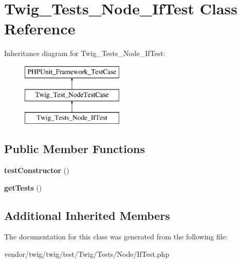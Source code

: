 \hypertarget{classTwig__Tests__Node__IfTest}{}\section{Twig\+\_\+\+Tests\+\_\+\+Node\+\_\+\+If\+Test Class Reference}
\label{classTwig__Tests__Node__IfTest}
Inheritance diagram for Twig\+\_\+\+Tests\+\_\+\+Node\+\_\+\+If\+Test\+:\begin{figure}[H]
\begin{center}
\leavevmode
\includegraphics[height=3.000000cm]{classTwig__Tests__Node__IfTest}
\end{center}
\end{figure}
\subsection*{Public Member Functions}
\begin{DoxyCompactItemize}
\item 
{\bfseries test\+Constructor} ()\hypertarget{classTwig__Tests__Node__IfTest_a80c5b33887d7a35de988df7c878c4165}{}\label{classTwig__Tests__Node__IfTest_a80c5b33887d7a35de988df7c878c4165}

\item 
{\bfseries get\+Tests} ()\hypertarget{classTwig__Tests__Node__IfTest_ab800955431fe98f1be8809be49490b58}{}\label{classTwig__Tests__Node__IfTest_ab800955431fe98f1be8809be49490b58}

\end{DoxyCompactItemize}
\subsection*{Additional Inherited Members}


The documentation for this class was generated from the following file\+:\begin{DoxyCompactItemize}
\item 
vendor/twig/twig/test/\+Twig/\+Tests/\+Node/If\+Test.\+php\end{DoxyCompactItemize}
